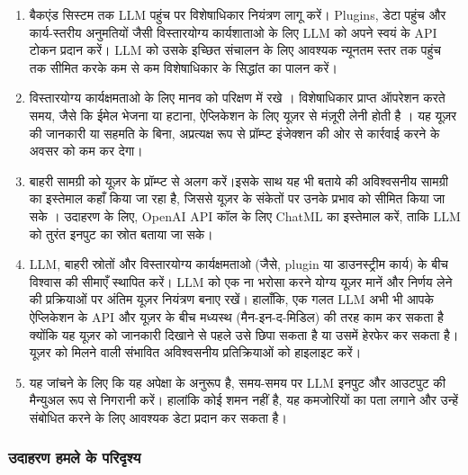 \documentclass[
]{article}
\providecommand{\tightlist}{%
  \setlength{\itemsep}{0pt}\setlength{\parskip}{0pt}}
\begin{document}
\begin{enumerate}
\def\labelenumi{\arabic{enumi}.}
\tightlist
\item
  बैकएंड सिस्टम तक LLM पहुंच पर विशेषाधिकार नियंत्रण लागू करें। Plugins, डेटा पहुंच और
  कार्य-स्तरीय अनुमतियों जैसी विस्तारयोग्य कार्यशाताओ के लिए LLM को अपने स्वयं के API
  टोकन प्रदान करें। LLM को उसके इच्छित संचालन के लिए आवश्यक न्यूनतम स्तर तक पहुंच तक
  सीमित करके कम से कम विशेषाधिकार के सिद्धांत का पालन करें।
\item
  विस्तारयोग्य कार्यक्षमताओ के लिए मानव को परिक्षण में रखे । विशेषाधिकार प्राप्त
  ऑपरेशन करते समय, जैसे कि ईमेल भेजना या हटाना, ऐप्लिकेशन के लिए यूज़र से मंज़ूरी लेनी
  होती है । यह यूज़र की जानकारी या सहमति के बिना, अप्रत्यक्ष रूप से प्रॉम्प्ट इंजेक्शन
  की ओर से कार्रवाई करने के अवसर को कम कर देगा।
\item
  बाहरी सामग्री को यूज़र के प्रॉम्प्ट से अलग करें।इसके साथ यह भी बताये की अविश्वसनीय
  सामग्री का इस्तेमाल कहाँ किया जा रहा है, जिससे यूज़र के संकेतों पर उनके प्रभाव को
  सीमित किया जा सके । उदाहरण के लिए, OpenAI API कॉल के लिए ChatML का इस्तेमाल
  करें, ताकि LLM को तुरंत इनपुट का स्रोत बताया जा सके।
\item
  LLM, बाहरी स्रोतों और विस्तारयोग्य कार्यक्षमताओ (जैसे, plugin या डाउनस्ट्रीम
  कार्य) के बीच विश्वास की सीमाएँ स्थापित करें। LLM को एक ना भरोसा करने योग्य यूज़र
  मानें और निर्णय लेने की प्रक्रियाओं पर अंतिम यूज़र नियंत्रण बनाए रखें। हालाँकि, एक गलत
  LLM अभी भी आपके ऐप्लिकेशन के API और यूज़र के बीच मध्यस्थ (मैन-इन-द-मिडिल) की तरह
  काम कर सकता है क्योंकि यह यूज़र को जानकारी दिखाने से पहले उसे छिपा सकता है या
  उसमें हेरफेर कर सकता है। यूज़र को मिलने वाली संभावित अविश्वसनीय प्रतिक्रियाओं को
  हाइलाइट करें।
\item
  यह जांचने के लिए कि यह अपेक्षा के अनुरूप है, समय-समय पर LLM इनपुट और आउटपुट की
  मैन्युअल रूप से निगरानी करें। हालांकि कोई शमन नहीं है, यह कमजोरियों का पता लगाने
  और उन्हें संबोधित करने के लिए आवश्यक डेटा प्रदान कर सकता है।
\end{enumerate}

\subsubsection{उदाहरण हमले के
परिदृश्य}\label{ux909ux926ux939ux930ux923-ux939ux92eux932-ux915-ux92aux930ux926ux936ux92f}
\end{document}

